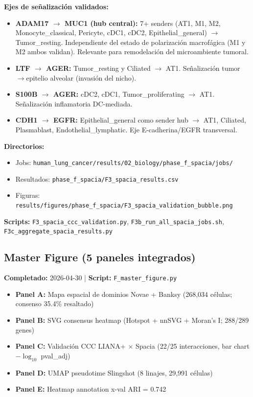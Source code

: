 \documentclass[11pt,a4paper]{article}
\begin{document}
\textbf{Ejes de señalización validados:}
\begin{itemize}[leftmargin=*]
\item \textbf{ADAM17 $\to$ MUC1 (hub central):} 7+ senders (AT1, M1, M2, Monocyte\_classical, Pericyte, cDC1, cDC2, Epithelial\_general) $\to$ Tumor\_resting. Independiente del estado de polarización macrofágica (M1 y M2 ambos validan). Relevante para remodelación del microambiente tumoral.
\item \textbf{LTF $\to$ AGER:} Tumor\_resting y Ciliated $\to$ AT1. Señalización tumor$\to$epitelio alveolar (invasión del nicho).
\item \textbf{S100B $\to$ AGER:} cDC2, cDC1, Tumor\_proliferating $\to$ AT1. Señalización inflamatoria DC-mediada.
\item \textbf{CDH1 $\to$ EGFR:} Epithelial\_general como sender hub $\to$ AT1, Ciliated, Plasmablast, Endothelial\_lymphatic. Eje E-cadherina/EGFR transversal.
\end{itemize}

\textbf{Directorios:}
\begin{itemize}[leftmargin=*]
\item Jobs: \texttt{\small human\_lung\_cancer/results/02\_biology/phase\_f\_spacia/jobs/}
\item Resultados: \texttt{\small phase\_f\_spacia/F3\_spacia\_results.csv}
\item Figuras: \texttt{\small results/figures/phase\_f\_spacia/F3\_spacia\_validation\_bubble.png}
\end{itemize}

\textbf{Scripts:} \texttt{F3\_spacia\_ccc\_validation.py}, \texttt{F3b\_run\_all\_spacia\_jobs.sh}, \texttt{F3c\_aggregate\_spacia\_results.py}

\subsection{Master Figure (5 paneles integrados)}
\textbf{Completado:} 2026-04-30 | \textbf{Script:} \texttt{F\_master\_figure.py}

\begin{itemize}[leftmargin=*]
\item \textbf{Panel A:} Mapa espacial de dominios Novae + Banksy (268,034 células; consenso 35.4\% resaltado)
\item \textbf{Panel B:} SVG consensus heatmap (Hotspot + nnSVG + Moran's I; 288/289 genes)
\item \textbf{Panel C:} Validación CCC LIANA+ × Spacia (22/25 interacciones, bar chart $-\log_{10}$ pval\_adj)
\item \textbf{Panel D:} UMAP pseudotime Slingshot (8 linajes, 29,991 células)
\item \textbf{Panel E:} Heatmap annotation x-val ARI = 0.742
\end{itemize}
\end{document}

